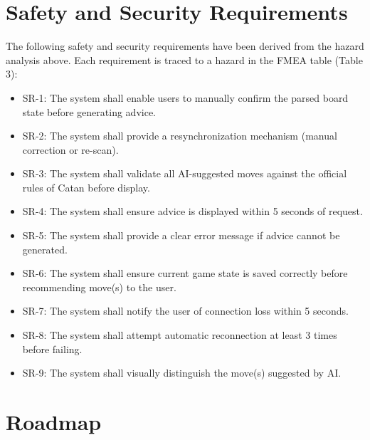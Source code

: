 \documentclass{article}
\begin{document}
\section{Safety and Security Requirements}


The following safety and security requirements have been derived from the hazard analysis above.
Each requirement is traced to a hazard in the FMEA table (Table 3):

\begin{itemize}
    \item SR-1: The system shall enable users to manually confirm the parsed board state before generating advice.
    \item SR-2: The system shall provide a resynchronization mechanism (manual correction or re-scan).
    \item SR-3: The system shall validate all AI-suggested moves against the official rules of Catan before display.
    \item SR-4: The system shall ensure advice is displayed within 5 seconds of request.
    \item SR-5: The system shall provide a clear error message if advice cannot be generated.
    \item SR-6: The system shall ensure current game state is saved correctly before recommending move(s) to the user.
    \item SR-7: The system shall notify the user of connection loss within 5 seconds.
    \item SR-8: The system shall attempt automatic reconnection at least 3 times before failing.
    \item SR-9: The system shall visually distinguish the move(s) suggested by AI.
\end{itemize}


\section{Roadmap}

\end{document}
